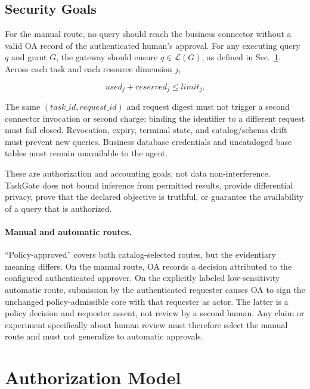 \documentclass[10pt,journal,compsoc]{IEEEtran}
\newcommand{\system}{TaskGate\xspace}
\newcommand{\grantlang}{\mathcal{L}}
\begin{document}
\subsection{Security Goals}

For the manual route, no query should reach the business connector without a
valid OA record of the authenticated human's approval.  For any executing query
$q$ and grant $G$, the gateway should ensure $q\in\grantlang(G)$, as defined in
Sec.~\ref{sec:model}.  Across each task and each resource dimension $j$,

\begin{equation}
  used_j + reserved_j \le limit_j.
  \label{eq:budget-invariant}
\end{equation}

The same $(task\_id,request\_id)$ and request digest must not trigger a second
connector invocation or second charge; binding the identifier to a different
request must fail closed.  Revocation, expiry, terminal state, and catalog/schema
drift must prevent new queries.  Business database credentials and uncataloged
base tables must remain unavailable to the agent.

These are authorization and accounting goals, not data non-interference.
\system does not bound inference from permitted results, provide differential
privacy, prove that the declared objective is truthful, or guarantee the
availability of a query that is authorized.

\paragraph{Manual and automatic routes.}
``Policy-approved'' covers both catalog-selected routes, but the evidentiary
meaning differs.  On the manual route, OA records a decision attributed to the
configured authenticated approver.  On the explicitly labeled low-sensitivity
automatic route, submission by the authenticated requester causes OA to sign the
unchanged policy-admissible core with that requester as actor.  The latter is a
policy decision and requester assent, not review by a second human.  Any claim or
experiment specifically about human review must therefore select the manual
route and must not generalize to automatic approvals.

\section{Authorization Model}
\label{sec:model}
\end{document}
